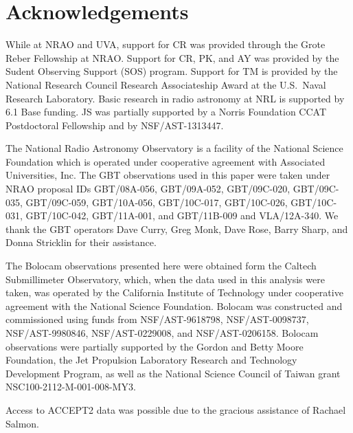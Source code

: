 \documentclass[iop,numberedappendix,apj]{emulateapj}
\begin{document}
\section*{Acknowledgements}

While at NRAO and UVA, support for CR was provided through the Grote Reber Fellowship at NRAO. 
Support for CR, PK, and AY was 
provided by the Sudent Observing Support (SOS) program. Support for TM is provided by the National Research 
Council Research Associateship Award at the U.S.\ Naval Research Laboratory. Basic research in radio 
astronomy at NRL is supported by 6.1 Base funding. JS was partially supported by a
Norris Foundation CCAT Postdoctoral Fellowship and by NSF/AST-1313447.

The National Radio Astronomy Observatory is a facility of the National Science Foundation which is operated
under cooperative agreement with Associated Universities, Inc. The GBT observations used in this paper were
taken under NRAO proposal IDs GBT/08A-056, GBT/09A-052, GBT/09C-020, GBT/09C-035, GBT/09C-059, GBT/10A-056, 
GBT/10C-017, GBT/10C-026, GBT/10C-031, GBT/10C-042, GBT/11A-001, and GBT/11B-009 and VLA/12A-340.
We  thank the GBT operators Dave Curry, Greg Monk, Dave Rose, Barry Sharp, and Donna Stricklin for their
assistance. 

The Bolocam observations presented here were obtained form the Caltech Submillimeter Observatory, which,
when the data used in this analysis were taken, was operated by the California Institute of Technology under
cooperative agreement with the National Science Foundation. Bolocam was constructed and commissioned using funds
from NSF/AST-9618798, NSF/AST-0098737, NSF/AST-9980846, NSF/AST-0229008, and NSF/AST-0206158. Bolocam observations
were partially supported by the Gordon and Betty Moore Foundation, the Jet Propulsion Laboratory Research and
Technology Development Program, as well as the National Science Council of Taiwan grant NSC100-2112-M-001-008-MY3.

Access to ACCEPT2 data was possible due to the gracious assistance of Rachael Salmon.



\appendix
\end{document}
